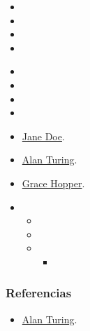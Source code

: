 \documentclass[a4paper,12pt]{man_cv}
\begin{document}
\thispagestyle{title}
\pagestyle{body}

\CVIntro
\lipsum[1-3]

\CVObjetivosProfesionales
\lipsum[2-4]

\CVHabilidadesTransversales
\begin{itemize}
  \item \lipsum[5][1]
  \item \lipsum[5][2]
  \item \lipsum[5][3]
  \item \lipsum[5][4]
\end{itemize}

\CVExperienciasSignificativas
\begin{itemize}
  \item \lipsum[5][5]
  \item \lipsum[5][6]
  \item \lipsum[5][7]
  \item \lipsum[5][8]
\end{itemize}

\CVRelacionesSignificativas
\begin{itemize}
  \item \href{https://www.linkedin.com/in/}{Jane Doe}.
  \item \href{https://www.linkedin.com/in/}{Alan Turing}.
  \item \href{https://www.linkedin.com/in/}{Grace Hopper}.
\end{itemize}

\CVExperiencia
{}
\begin{itemize}
  \item \lipsum[8][1]
        \begin{itemize}
          \item \lipsum[8][2]
          \item \lipsum[8][3]
          \item \lipsum[8][4]
                \begin{itemize}
                  \item \lipsum[8][5]
                \end{itemize}
        \end{itemize}
\end{itemize}
\subsubsection*{Referencias}
\begin{itemize}
  \item \href{https://www.linkedin.com/in/}{Alan Turing}.
\end{itemize}
\end{document}
